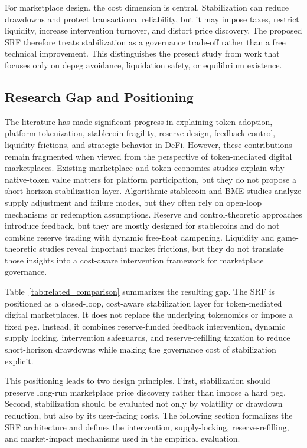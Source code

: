 \documentclass[a4paper,fleqn]{cas-dc}
\begin{document}
For marketplace design, the cost dimension is central. Stabilization can reduce drawdowns and protect transactional reliability, but it may impose taxes, restrict liquidity, increase intervention turnover, and distort price discovery. The proposed SRF therefore treats stabilization as a governance trade-off rather than a free technical improvement. This distinguishes the present study from work that focuses only on depeg avoidance, liquidation safety, or equilibrium existence.

\subsection{Research Gap and Positioning}

The literature has made significant progress in explaining token adoption, platform tokenization, stablecoin fragility, reserve design, feedback control, liquidity frictions, and strategic behavior in DeFi. However, these contributions remain fragmented when viewed from the perspective of token-mediated digital marketplaces. Existing marketplace and token-economics studies explain why native-token value matters for platform participation, but they do not propose a short-horizon stabilization layer. Algorithmic stablecoin and BME studies analyze supply adjustment and failure modes, but they often rely on open-loop mechanisms or redemption assumptions. Reserve and control-theoretic approaches introduce feedback, but they are mostly designed for stablecoins and do not combine reserve trading with dynamic free-float dampening. Liquidity and game-theoretic studies reveal important market frictions, but they do not translate those insights into a cost-aware intervention framework for marketplace governance.

Table~\ref{tab:related_comparison} summarizes the resulting gap. The SRF is positioned as a closed-loop, cost-aware stabilization layer for token-mediated digital marketplaces. It does not replace the underlying tokenomics or impose a fixed peg. Instead, it combines reserve-funded feedback intervention, dynamic supply locking, intervention safeguards, and reserve-refilling taxation to reduce short-horizon drawdowns while making the governance cost of stabilization explicit.

This positioning leads to two design principles. First, stabilization should preserve long-run marketplace price discovery rather than impose a hard peg. Second, stabilization should be evaluated not only by volatility or drawdown reduction, but also by its user-facing costs. The following section formalizes the SRF architecture and defines the intervention, supply-locking, reserve-refilling, and market-impact mechanisms used in the empirical evaluation.
\end{document}
